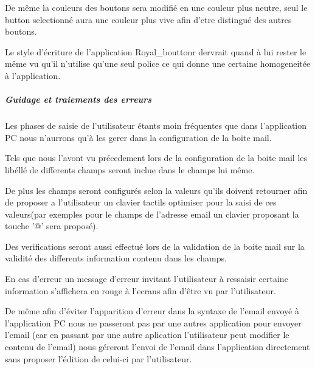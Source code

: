 \documentclass[etudiants]{support-iutrs}
\begin{document}
De même la couleurs des boutons sera modifié en une couleur plus neutre, seul le button selectionné aura une couleur plus vive afin d'etre distingué des autres boutons. 

Le style d'écriture de l'application Royal\_bouttonr dervrait quand à lui rester le même vu qu'il n'utilise qu'une seul police ce qui donne une certaine homogeneitée à l'application. 

\subparagraph{Guidage et traiements des erreurs}Les phases de saisie de l'utilisateur étants moin fréquentes que dans l'application PC nous n'aurrons qu'à les gerer dans la configuration de la boite mail.  

Tels que nous l'avont vu précedement lors de la configuration de la boite mail les libéllé de differents champs seront inclue dans le champs lui même.
 
De plus les champs seront configurés selon la valeurs qu'ils doivent retourner afin de proposer a l'utilisateur un clavier tactils optimiser pour la saisi de ces valeurs(par exemples pour le champs de l'adresse email un clavier proposant la touche '@' sera proposé).

Des verifications seront aussi effectué lors de la validation de la boite mail sur la validité des differents information contenu dans les champs.

En cas d'erreur un message d'erreur invitant l'utilisateur à ressaisir certaine information s'affichera en rouge à l'ecrans afin d'être vu par l'utilisateur. 

De même afin d'éviter l'apparition d'erreur dans la syntaxe de l'email envoyé à l'application PC nous ne passeront pas par une autres application pour envoyer l'email (car en passant par une autre aplication l'utilisateur peut modifier le contenu de l'email) nous géreront l'envoi de l'email dans l'application directement sans proposer l'édition de celui-ci par l'utilisateur. 
\end{document}
